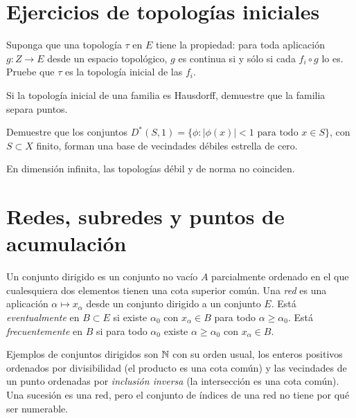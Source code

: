 \section{Ejercicios de topologías iniciales}
\begin{ejercicio}\label{ej:v3-l13-1}
Suponga que una topología $\tau$ en $E$ tiene la propiedad: para toda aplicación $g:Z\to E$ desde un espacio topológico, $g$ es continua si y sólo si cada $f_i\circ g$ lo es. Pruebe que $\tau$ es la topología inicial de las $f_i$.
\end{ejercicio}


\begin{ejercicio}\label{ej:v3-l13-2}
Si la topología inicial de una familia es Hausdorff, demuestre que la familia separa puntos.
\end{ejercicio}


\begin{ejercicio}\label{ej:v3-l13-3}
Demuestre que los conjuntos $D^*(S,1)=\{\phi:|\phi(x)|<1\text{ para todo }x\in S\}$, con $S\subset X$ finito, forman una base de vecindades débiles estrella de cero.
\end{ejercicio}


\begin{ejercicio}\label{ej:v3-l13-4}
En dimensión infinita, las topologías débil y de norma no coinciden.
\end{ejercicio}


\section{Redes, subredes y puntos de acumulación}\label{lec:v3-14}
\begin{definicion}\label{v3:redes}
Un conjunto dirigido es un conjunto no vacío $A$ parcialmente ordenado en el que cualesquiera dos elementos tienen una cota superior común. Una \emph{red} es una aplicación $\alpha\mapsto x_\alpha$ desde un conjunto dirigido a un conjunto $E$. Está \emph{eventualmente} en $B\subset E$ si existe $\alpha_0$ con $x_\alpha\in B$ para todo $\alpha\ge\alpha_0$. Está \emph{frecuentemente} en $B$ si para todo $\alpha_0$ existe $\alpha\ge\alpha_0$ con $x_\alpha\in B$.
\end{definicion}
Ejemplos de conjuntos dirigidos son $\mathbb N$ con su orden usual, los enteros positivos ordenados por divisibilidad (el producto es una cota común) y las vecindades de un punto ordenadas por \emph{inclusión inversa} (la intersección es una cota común). Una sucesión es una red, pero el conjunto de índices de una red no tiene por qué ser numerable.

